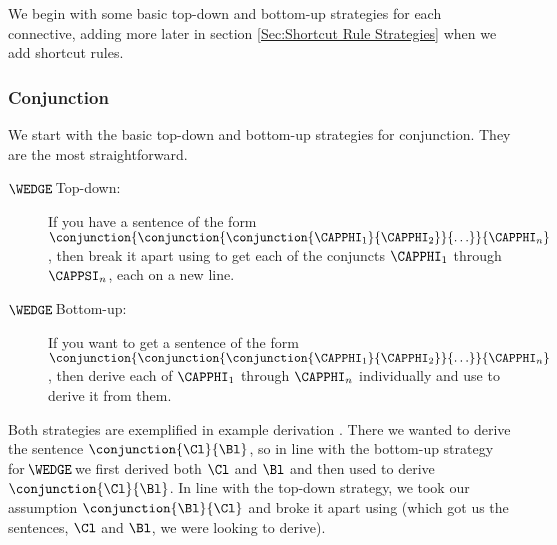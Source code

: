 We begin with some basic top-down and bottom-up strategies for each connective, adding more later in section \ref{Sec:Shortcut Rule Strategies} when we add shortcut rules.

\subsubsection*{Conjunction} 
We start with the basic top-down and bottom-up strategies for conjunction. They are the most straightforward.
\begin{description}
\item[$\WEDGE\!$ Top-down:] If you have a sentence of the form $\conjunction{\conjunction{\conjunction{\CAPPHI_1}{\CAPPHI_2}}{\ldots}}{\CAPPHI_n}$, then break it apart using  to get each of the conjuncts $\CAPPHI_1$ through $\CAPPSI_n$, each on a new line.
\item[$\WEDGE\!$ Bottom-up:] If you want to get a sentence of the form $\conjunction{\conjunction{\conjunction{\CAPPHI_1}{\CAPPHI_2}}{\ldots}}{\CAPPHI_n}$, then derive each of $\CAPPHI_1$ through $\CAPPHI_n$ individually and use  to derive it from them. 
\end{description} 
Both strategies are exemplified in example derivation . 
There we wanted to derive the sentence $\conjunction{\Cl}{\Bl}$, so in line with the bottom-up strategy for $\!\WEDGE\!$ we first derived both $\Cl$ and $\Bl$ and then used  to derive $\conjunction{\Cl}{\Bl}$. 
In line with the top-down strategy, we took our assumption $\conjunction{\Bl}{\Cl}$ and broke it apart using  (which got us the sentences, $\Cl$ and $\Bl$, we were looking to derive). 

